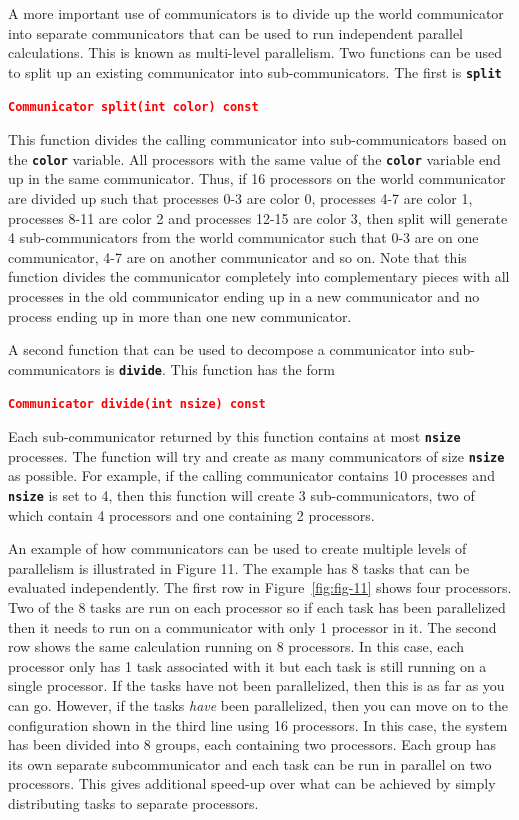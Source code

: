 \documentclass[12pt]{report} %
\begin{document}
A more important use of communicators is to divide up the world communicator into separate communicators that can be used to run independent parallel calculations. This is known as multi-level parallelism. Two functions can be used to split up an existing communicator into sub-communicators. The first is \texttt{\textbf{split}}

\textcolor{red}{\texttt{\textbf{Communicator split(int color) const}}}

This function divides the calling communicator into sub-communicators based on the \texttt{\textbf{color}} variable. All processors with the same value of the \texttt{\textbf{color}} variable end up in the same communicator. Thus, if 16 processors on the world communicator are divided up such that processes 0-3 are color 0, processes 4-7 are color 1, processes 8-11 are color 2 and processes 12-15 are color 3, then split will generate 4 sub-communicators from the world communicator such that 0-3 are on one communicator, 4-7 are on another communicator and so on. Note that this function divides the communicator completely into complementary pieces with all processes in the old communicator ending up in a new communicator and no process ending up in more than one new communicator.

A second function that can be used to decompose a communicator into sub-communicators is \texttt{\textbf{divide}}. This function has the form

\textcolor{red}{\texttt{\textbf{Communicator divide(int nsize) const}}}

Each sub-communicator returned by this function contains at most \texttt{\textbf{nsize}} processes. The function will try and create as many communicators of size \texttt{\textbf{nsize}} as possible. For example, if the calling communicator contains 10 processes and \texttt{\textbf{nsize}} is set to 4, then this function will create 3 sub-communicators, two of which contain 4 processors and one containing 2 processors.

An example of how communicators can be used to create multiple levels of parallelism is illustrated in Figure 11. The example has 8 tasks that can be evaluated independently. The first row in Figure~\ref{fig:fig-11} shows four processors. Two of the 8 tasks are run on each processor so if each task has been parallelized then it needs to run on a communicator with only 1 processor in it. The second row shows the same calculation running on 8 processors. In this case, each processor only has 1 task associated with it but each task is still running on a single processor. If the tasks have not been parallelized, then this is as far as you can go. However, if the tasks \textit{have} been parallelized, then you can move on to the configuration shown in the third line using 16 processors. In this case, the system has been divided into 8 groups, each containing two processors. Each group has its own separate subcommunicator and each task can be run in parallel on two processors. This gives additional speed-up over what can be achieved by simply distributing tasks to separate processors.
\end{document}

